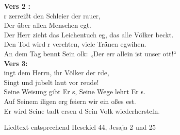 \textbf{Vers 2 :}\\
r zerreißt den Schleier der rauer,\\
Der über allen Menschen egt.\\
Der Herr zieht das Leichentuch eg, das alle Völker beckt.\\
Den Tod wird r verchten, viele Tränen egwihen.\\
An dem Tag bennt Sein olk: „Der err allein ist unser ott!“\\

\textbf{Vers 3:}\\
ingt dem Herrn, ihr Völker der rde,\\
Singt und jubelt laut vor reude!\\
Seine Weisung gibt Er s, Seine Wege lehrt Er s.\\
Auf Seinem iligen erg feiern wir ein oßes est.\\
Er wird Seine tadt ersen d Sein Volk wiederhersteln.\\

\begin{footnotesize}
Liedtext entsprechend Hesekiel 44, Jesaja 2 und 25
\end{footnotesize}